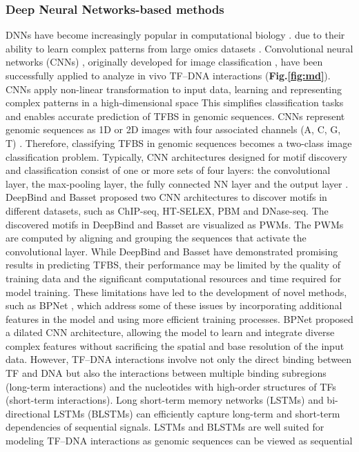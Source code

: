 \documentclass[a4paper, titlepage, openright]{book}
\begin{document}
\subsubsection{Deep Neural Networks-based methods}
DNNs have become increasingly popular in computational biology \citep{talukder2021interpretation, zeng2020integrating, singh2016deepchrome, singh2019predicting, zeng2018prediction, kelley2018sequential, li2019deeptact, yin2019deephistone, manzanarez2018model}. due to their ability to learn complex patterns \citep{park2015deep} from large omics datasets \citep{zhang2019deep}. Convolutional neural networks (CNNs)  \citep{lecun2015deep} , originally developed for image classification \citep{lecun2015deep, sainath2013improvements, vu2017use},  have been successfully applied to analyze in vivo TF–DNA interactions \citep{alipanahi2015predicting, zhou2015predicting, kelley2016basset, zeng2016convolutional} (\textbf{Fig.\ref{fig:md}}). CNNs apply non-linear transformation to input data, learning and representing complex patterns in a high-dimensional space \citep{bengio2013representation} This simplifies classification tasks and enables accurate prediction of TFBS in genomic sequences. CNNs represent genomic sequences as 1D or 2D images with four associated channels (A, C, G, T) \citep{zeng2016convolutional}. Therefore, classifying TFBS in genomic sequences becomes a two-class image classification problem. Typically, CNN architectures designed for motif discovery and classification consist of one or more sets of four layers: the convolutional layer, the max-pooling layer, the fully connected NN layer and the output layer \citep{zeng2016convolutional}. DeepBind \citep{alipanahi2015predicting} and Basset \citep{kelley2016basset} proposed two CNN architectures to discover motifs in different datasets, such as ChIP-seq, HT-SELEX, PBM and DNase-seq. The discovered motifs in DeepBind and Basset are visualized as PWMs. The PWMs are computed by aligning and grouping the sequences that activate the convolutional layer. While DeepBind and Basset have demonstrated promising results in predicting TFBS, their performance may be limited by the quality of training data and the significant computational resources and time required for model training. These limitations have led to the development of novel methods, such as BPNet \citep{avsec2021base},  which address some of these issues by incorporating additional features in the model and using more efficient training processes. BPNet proposed a dilated CNN architecture, allowing the model to learn and integrate diverse complex features without sacrificing the spatial and base resolution of the input data.  However, TF–DNA interactions involve not only the direct binding between TF and DNA but also the interactions between multiple binding subregions (long-term interactions) and the nucleotides with high-order structures of TFs (short-term interactions). Long short-term memory networks (LSTMs) \citep{hochreiter1997long} and bi-directional LSTMs (BLSTMs) can efficiently capture long-term and short-term dependencies of sequential signals. LSTMs and BLSTMs are well suited for modeling TF–DNA interactions as genomic sequences can be viewed as sequential 
\end{document}

